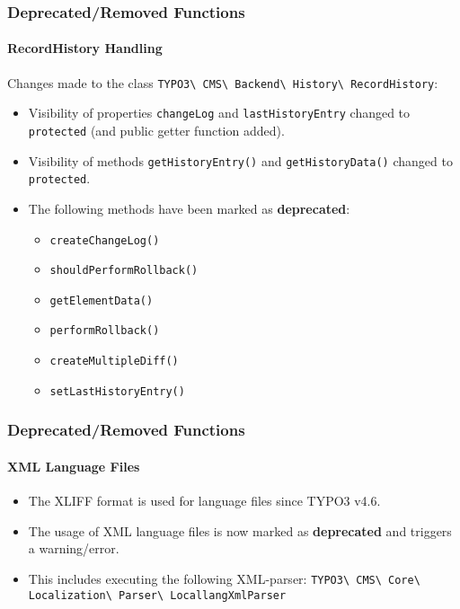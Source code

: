 \begin{frame}[fragile]
	\frametitle{Deprecated/Removed Functions}
	\framesubtitle{RecordHistory Handling}

	Changes made to the class
		\smaller
			\texttt{TYPO3\textbackslash
				CMS\textbackslash
				Backend\textbackslash
				History\textbackslash
				RecordHistory}:
		\normalsize

	\begin{itemize}

		\item Visibility of properties \texttt{changeLog} and \texttt{lastHistoryEntry}
			changed to \texttt{protected} (and public getter function added).
		\item Visibility of methods \texttt{getHistoryEntry()} and \texttt{getHistoryData()}
			changed to \texttt{protected}.
		\item The following methods have been marked as \textbf{deprecated}:

			\begin{itemize}\smaller
				\item \texttt{createChangeLog()}
				\item \texttt{shouldPerformRollback()}
				\item \texttt{getElementData()}
				\item \texttt{performRollback()}
				\item \texttt{createMultipleDiff()}
				\item \texttt{setLastHistoryEntry()}
			\end{itemize}\normalsize

	\end{itemize}

\end{frame}


\begin{frame}[fragile]
	\frametitle{Deprecated/Removed Functions}
	\framesubtitle{XML Language Files}

	\begin{itemize}
		\item The XLIFF format is used for language files since TYPO3 v4.6.
		\item The usage of XML language files is now marked as \textbf{deprecated}
			and triggers a warning/error.
		\item This includes executing the following XML-parser:\newline
			\small
				\texttt{TYPO3\textbackslash
					CMS\textbackslash
					Core\textbackslash
					Localization\textbackslash
					Parser\textbackslash
					LocallangXmlParser}
			\normalsize
	\end{itemize}

\end{frame}

